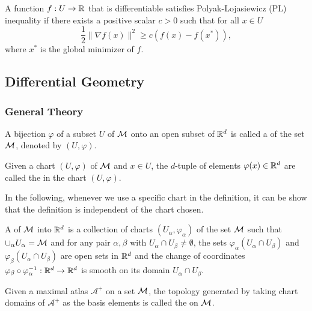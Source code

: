 \documentclass[11pt,a4paper]{article}
\begin{document}
\begin{mydef} \label{def:pl_inequality}
A function $f:U\rightarrow \mathbb{R}$ that is differentiable satisfies Polyak-Lojasiewicz (PL) inequality if there exists a positive scalar $c > 0$ such that for all $x\in U$
\begin{equation*}
\dfrac{1}{2}\|\nabla f(x)\|^2 \ge c(f(x) - f(x^*)),
\end{equation*}
where $x^*$ is the global minimizer of $f$.
\end{mydef}

\subsection{Differential Geometry} \label{section:diffgeo}

\subsubsection{General Theory}

\begin{mydef}
A bijection $\varphi$ of a subset $U$ of $\mathcal{M}$ onto an open subset of $\mathbb{R}^d$ is called a  of the set $\mathcal{M}$, denoted by $(U,\varphi)$.
\end{mydef}

Given a chart $(U,\varphi)$ of $\mathcal{M}$ and $x\in U$, the $d$-tuple of elements $\varphi(x)\in \mathbb{R}^d$ are called the  in the chart $(U,\varphi)$.

\begin{remark}
In the following, whenever we use a specific chart in the definition, it can be show that the definition is independent of the chart chosen.
\end{remark}

\begin{mydef}
A  of $\mathcal{M}$ into $\mathbb{R}^d$ is a collection of charts $(U_\alpha,\varphi_\alpha)$ of the set $\mathcal{M}$ such that $\cup_\alpha U_\alpha = \mathcal{M}$ and for any pair $\alpha,\beta$ with $U_\alpha\cap U_\beta \neq \emptyset$, the sets $\varphi_\alpha(U_\alpha\cap U_\beta)$ and $\varphi_\beta(U_\alpha\cap U_\beta)$ are open sets in $\mathbb{R}^d$ and the change of coordinates $\varphi_\beta\circ \varphi_\alpha^{-1}:\mathbb{R}^d\rightarrow \mathbb{R}^d$ is smooth on its domain $U_\alpha\cap U_\beta$.
\end{mydef}

\begin{mydef}
Given a maximal atlas $\mathcal{A}^+$ on a set $\mathcal{M}$, the topology generated by taking chart domains of $\mathcal{A}^+$ as the basis elements is called the  on $\mathcal{M}$.
\end{mydef}
\end{document}
